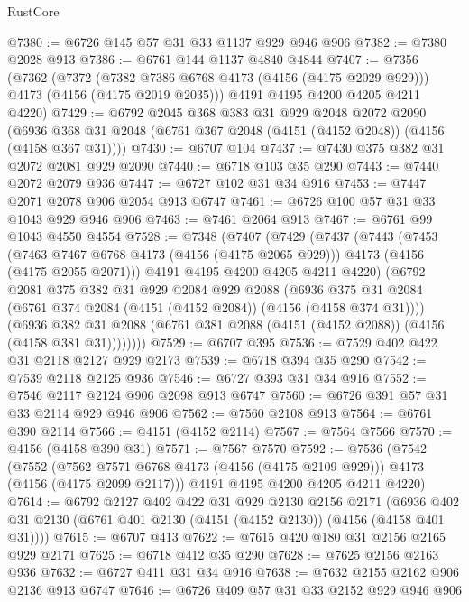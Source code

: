 \begin{lexlean}{RustCore}
\begin{coremodule}
@7380 := @6726 @145 @57 @31 @33 @1137 @929 @946 @906
@7382 := @7380 @2028 @913
@7386 := @6761 @144 @1137 @4840 @4844
@7407 := @7356
    (@7362
      (@7372 (@7382 @7386 @6768 @4173 (@4156 (@4175 @2029 @929))) @4173 (@4156 (@4175 @2019 @2035)))
      @4191
      @4195
      @4200
      @4205
      @4211
      @4220)
@7429 := @6792
    @2045
    @368
    @383
    @31
    @929
    @2048
    @2072
    @2090
    (@6936 @368 @31 @2048 (@6761 @367 @2048 (@4151 (@4152 @2048)) (@4156 (@4158 @367 @31))))
@7430 := @6707 @104
@7437 := @7430 @375 @382 @31 @2072 @2081 @929 @2090
@7440 := @6718 @103 @35 @290
@7443 := @7440 @2072 @2079 @936
@7447 := @6727 @102 @31 @34 @916
@7453 := @7447 @2071 @2078 @906 @2054 @913 @6747
@7461 := @6726 @100 @57 @31 @33 @1043 @929 @946 @906
@7463 := @7461 @2064 @913
@7467 := @6761 @99 @1043 @4550 @4554
@7528 := @7348
    (@7407
      (@7429
        (@7437
          (@7443
            (@7453
              (@7463 @7467 @6768 @4173 (@4156 (@4175 @2065 @929)))
              @4173
              (@4156 (@4175 @2055 @2071)))
            @4191
            @4195
            @4200
            @4205
            @4211
            @4220)
          (@6792
            @2081
            @375
            @382
            @31
            @929
            @2084
            @929
            @2088
            (@6936 @375 @31 @2084 (@6761 @374 @2084 (@4151 (@4152 @2084)) (@4156 (@4158 @374 @31))))
            (@6936
              @382
              @31
              @2088
              (@6761 @381 @2088 (@4151 (@4152 @2088)) (@4156 (@4158 @381 @31))))))))
@7529 := @6707 @395
@7536 := @7529 @402 @422 @31 @2118 @2127 @929 @2173
@7539 := @6718 @394 @35 @290
@7542 := @7539 @2118 @2125 @936
@7546 := @6727 @393 @31 @34 @916
@7552 := @7546 @2117 @2124 @906 @2098 @913 @6747
@7560 := @6726 @391 @57 @31 @33 @2114 @929 @946 @906
@7562 := @7560 @2108 @913
@7564 := @6761 @390 @2114
@7566 := @4151 (@4152 @2114)
@7567 := @7564 @7566
@7570 := @4156 (@4158 @390 @31)
@7571 := @7567 @7570
@7592 := @7536
    (@7542
      (@7552 (@7562 @7571 @6768 @4173 (@4156 (@4175 @2109 @929))) @4173 (@4156 (@4175 @2099 @2117)))
      @4191
      @4195
      @4200
      @4205
      @4211
      @4220)
@7614 := @6792
    @2127
    @402
    @422
    @31
    @929
    @2130
    @2156
    @2171
    (@6936 @402 @31 @2130 (@6761 @401 @2130 (@4151 (@4152 @2130)) (@4156 (@4158 @401 @31))))
@7615 := @6707 @413
@7622 := @7615 @420 @180 @31 @2156 @2165 @929 @2171
@7625 := @6718 @412 @35 @290
@7628 := @7625 @2156 @2163 @936
@7632 := @6727 @411 @31 @34 @916
@7638 := @7632 @2155 @2162 @906 @2136 @913 @6747
@7646 := @6726 @409 @57 @31 @33 @2152 @929 @946 @906

\end{coremodule}
\end{lexlean}
